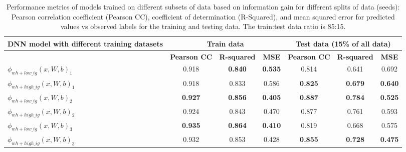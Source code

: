 \documentclass[journal abbreviation, manuscript]{copernicus}
\begin{document}
\begin{table}[h]
  \centering
  \begin{tabular}{|l|c|c|c|c|c|c|}
    \hline
    \textbf{DNN model with different training datasets
    } & \multicolumn{3}{c|}{\textbf{Train data}} & \multicolumn{3}{c|}{\textbf{Test data (15\% of all data)}}  \\
    \hline
           & \textbf{Pearson CC} & \textbf{R-squared} & \textbf{MSE} & \textbf{Pearson CC} & \textbf{R-squared} & \textbf{MSE} \\
    \hline
    \textbf{$\phi_{wh+low\_ig} (x, W, b)_1$} & 0.918 & \textbf{0.840} & \textbf{0.535} & 0.814 & 0.641 & 0.692 \\
    \hline
    \textbf{$\phi_{wh+high\_ig} (x, W, b)_1$} & 0.918 & 0.833 & 0.586 & \textbf{0.825} & \textbf{0.679} & \textbf{0.640} \\
    \hline
    \hline
    \textbf{$\phi_{wh+low\_ig} (x, W, b)_2$} & \textbf{0.927} & \textbf{0.856} & \textbf{0.405} & \textbf{0.887} & \textbf{0.784} & \textbf{0.525}\\
    \hline
    \textbf{$\phi_{wh+high\_ig} (x, W, b)_2$} & 0.924 & 0.843 & 0.470 & 0.877 & 0.761 & 0.593 \\
    \hline
    \hline
    \textbf{$\phi_{wh+low\_ig} (x, W, b)_3$} & \textbf{0.935} & \textbf{0.864} & \textbf{0.410} & 0.819 & 0.668 & 0.575 \\
    \hline
    \textbf{$\phi_{wh+high\_ig} (x, W, b)_3$} & 0.932 & 0.853 & 0.428 & \textbf{0.855} & \textbf{0.728} & \textbf{0.475} \\
    \hline

  \end{tabular}
  \caption{Performance metrics of models trained on different subsets of data based on information gain for different splits of data (seeds): Pearson correlation coefficient (Pearson CC), coefficient of determination (R-Squared), and mean squared error for predicted values vs observed labels for the training and testing data. The train:test data ratio is 85:15.}
  \label{tab:infogainexperiment}
\end{table}




\newpage
\end{document}
